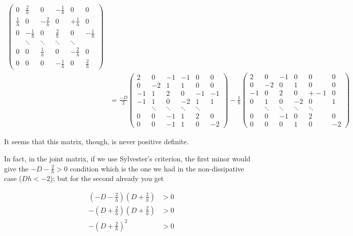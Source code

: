 \documentclass{article}
\begin{document}
\begin{align*}
\begin{pmatrix}
        0 & \frac{2}{h} & 0 &- \frac{1}{h} & 0 & 0\\
         \frac{1}{h} & 0 & - \frac{2}{h} & 0 &  + \frac{1}{h} & 0\\
       0 &  - \frac{1}{h} & 0 & \frac{2}{h} & 0 & - \frac{1}{h}\\
        & \ddots & \ddots & \ddots & \ddots \\
 0 & 0 & \frac{1}{h} & 0 & - \frac{2}{h} & 0\\0 & 0 & 0 & - \frac{1}{h} & 0 & \frac{2}{h}
    \end{pmatrix} \\
    & = \frac{-D}{2} \begin{pmatrix}
        2 & 0 & -1 & -1 & 0 & 0\\
        0 & -2 & 1 & 1  & 0 & 0\\
        -1 & 1 & 2 & 0 & -1  & -1\\
        -1 & 1  & 0 & -2 & 1 & 1 \\
        & \ddots & \ddots & \ddots & \ddots \\
 0 & 0 & -1 & 1 & 2 & 0\\0 & 0 & -1 & 1  & 0 & -2
    \end{pmatrix} - \frac{1}{h} \begin{pmatrix}
        2  & 0 & -1 & 0 & 0 & 0\\
        0 & -2  & 0 &1 & 0 & 0\\
         -1 & 0 & 2  & 0 &  + -1 & 0\\
       0 &  1 & 0 & -2  & 0 & 1\\
        & \ddots & \ddots & \ddots & \ddots \\
 0 & 0 & -1 & 0 & 2 & 0\\0 & 0 & 0 & 1 & 0 & -2 
    \end{pmatrix} 
\end{align*}

It seems that this matrix, though, is never positive definite.

In fact, in the joint matrix, if we use Sylvester's criterion, the first minor would give the $-D - \frac{2}{h} > 0$ condition which is the one we had in the non-dissipative case ($Dh < -2$); but for the second already you get 

\[\begin{aligned}
    \left(-D - \frac{2}{h}\right) \left(D + \frac{2}{h}\right) & > 0 \\
    -\left(D + \frac{2}{h}\right) \left(D + \frac{2}{h}\right) & > 0 \\
    -\left(D + \frac{2}{h}\right)^2 &> 0 \\
\end{aligned}\]
\end{document}
